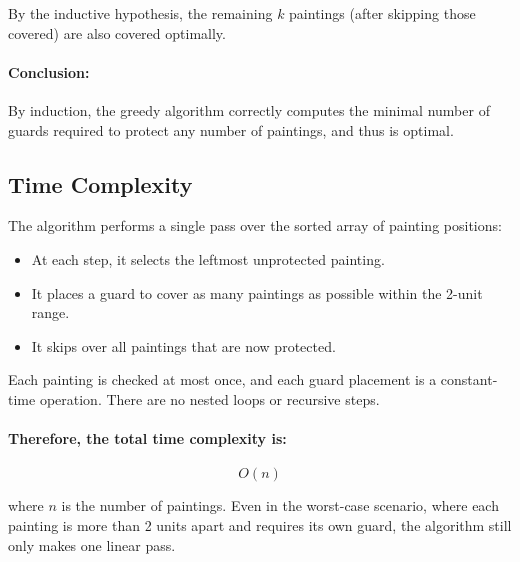\documentclass[12pt]{article}
\begin{document}
By the inductive hypothesis, the remaining $k$ paintings (after skipping those covered) are also covered optimally.

\paragraph{Conclusion:}  
By induction, the greedy algorithm correctly computes the minimal number of guards required to protect any number of paintings, and thus is optimal.
\newpage
\subsection*{Time Complexity}

The algorithm performs a single pass over the sorted array of painting positions:

\begin{itemize}
    \item At each step, it selects the leftmost unprotected painting.
    \item It places a guard to cover as many paintings as possible within the 2-unit range.
    \item It skips over all paintings that are now protected.
\end{itemize}

Each painting is checked at most once, and each guard placement is a constant-time operation. There are no nested loops or recursive steps.

\paragraph{Therefore, the total time complexity is:}
\[
\boxed{O(n)}
\]

where \( n \) is the number of paintings. Even in the worst-case scenario, where each painting is more than 2 units apart and requires its own guard, the algorithm still only makes one linear pass.
\end{document}
